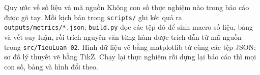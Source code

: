 \begin{phathien}{Quy ước về số liệu và mã nguồn}
Không con số thực nghiệm nào trong báo cáo được gõ tay. Mỗi kịch bản trong \texttt{scripts/} ghi kết quả ra
\texttt{outputs/metrics/*.json}; \texttt{build.py} đọc các tệp đó để sinh macro số liệu, bảng và vết suy luận, rồi
trích nguyên văn từng hàm được trích dẫn từ mã nguồn trong \texttt{src/TieuLuan 02}. Hình dữ liệu vẽ bằng
matplotlib từ cùng các tệp JSON; sơ đồ lý thuyết vẽ bằng TikZ. Chạy lại thực nghiệm rồi dựng lại báo cáo thì mọi
con số, bảng và hình đổi theo.
\end{phathien}

